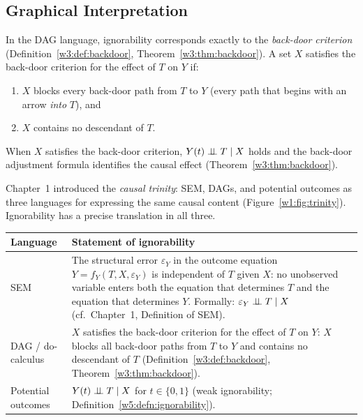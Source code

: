 \documentclass[master.tex]{subfiles}
\begin{document}
\subsection{Graphical Interpretation}

In the DAG language, ignorability corresponds exactly to the
\emph{back-door criterion} (Definition~\ref{w3:def:backdoor},
Theorem~\ref{w3:thm:backdoor}).  A set $X$ satisfies the back-door
criterion for the effect of $T$ on $Y$ if:
\begin{enumerate}
  \item $X$ blocks every back-door path from $T$ to $Y$ (every path
    that begins with an arrow \emph{into} $T$), and
  \item $X$ contains no descendant of $T$.
\end{enumerate}
When $X$ satisfies the back-door criterion,
$Y(t) \perp\!\!\!\perp T \mid X$ holds and the back-door adjustment formula
identifies the causal effect (Theorem~\ref{w3:thm:backdoor}).

Chapter~1 introduced the \emph{causal trinity}: SEM, DAGs, and
potential outcomes as three languages for expressing the same causal
content (Figure~\ref{w1:fig:trinity}).  Ignorability has a precise
translation in all three.

\begin{tcolorbox}[defstyle, title={Three Languages for Ignorability}]
\renewcommand{\arraystretch}{1.55}
\begin{tabular}{p{3.2cm} p{9.2cm}}
\toprule
\textbf{Language} & \textbf{Statement of ignorability} \\
\midrule
SEM
  & The structural error $\varepsilon_Y$ in the outcome equation
    $Y = f_Y(T, X, \varepsilon_Y)$ is independent of $T$ given $X$:
    no unobserved variable enters both the equation that determines $T$
    and the equation that determines $Y$.
    Formally: $\varepsilon_Y \perp\!\!\!\perp T \mid X$
    (cf.\ Chapter~1, Definition of SEM). \\
DAG / do-calculus
  & $X$ satisfies the back-door criterion for the effect of $T$ on $Y$:
    $X$ blocks all back-door paths from $T$ to $Y$ and contains no
    descendant of $T$
    (Definition~\ref{w3:def:backdoor}, Theorem~\ref{w3:thm:backdoor}). \\
Potential outcomes
  & $Y(t) \perp\!\!\!\perp T \mid X$ for $t \in \{0,1\}$
    (weak ignorability; Definition~\ref{w5:defn:ignorability}). \\
\bottomrule
\end{tabular}
\renewcommand{\arraystretch}{1}
\end{tcolorbox}
\end{document}
